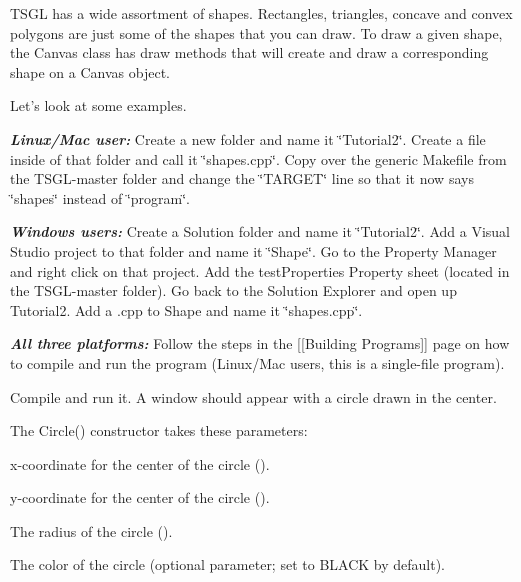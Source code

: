 T\+S\+GL has a wide assortment of shapes. Rectangles, triangles, concave and convex polygons are just some of the shapes that you can draw. To draw a given shape, the Canvas class has draw methods that will create and draw a corresponding shape on a Canvas object.

Let’s look at some examples.

{\itshape {\bfseries{Linux/\+Mac user\+:}}} Create a new folder and name it \char`\"{}\+Tutorial2\char`\"{}. Create a file inside of that folder and call it \char`\"{}shapes.\+cpp\char`\"{}. Copy over the generic Makefile from the T\+S\+G\+L-\/master folder and change the \char`\"{}\+T\+A\+R\+G\+E\+T\char`\"{} line so that it now says \char`\"{}shapes\char`\"{} instead of \char`\"{}program\char`\"{}.

{\itshape {\bfseries{Windows users\+:}}} Create a Solution folder and name it \char`\"{}\+Tutorial2\char`\"{}. Add a Visual Studio project to that folder and name it \char`\"{}\+Shape\char`\"{}. Go to the Property Manager and right click on that project. Add the test\+Properties Property sheet (located in the T\+S\+G\+L-\/master folder). Go back to the Solution Explorer and open up Tutorial2. Add a .cpp to Shape and name it \char`\"{}shapes.\+cpp\char`\"{}.

{\itshape {\bfseries{All three platforms\+:}}} Follow the steps in the \mbox{[}\mbox{[}Building Programs\mbox{]}\mbox{]} page on how to compile and run the program (Linux/\+Mac users, this is a single-\/file program).


\begin{DoxyCode}{0}
\DoxyCodeLine{\textcolor{preprocessor}{\#include <tsgl.h>}}
\DoxyCodeLine{}
\DoxyCodeLine{\}}
\end{DoxyCode}


Compile and run it. A window should appear with a circle drawn in the center.

The {\ttfamily Circle()} constructor takes these parameters\+:


\begin{DoxyItemize}
\item x-\/coordinate for the center of the circle ({}).
\item y-\/coordinate for the center of the circle ({}).
\item The radius of the circle ({}).
\item The color of the circle (optional parameter; set to {\ttfamily B\+L\+A\+CK} by default).
\end{DoxyItemize}

